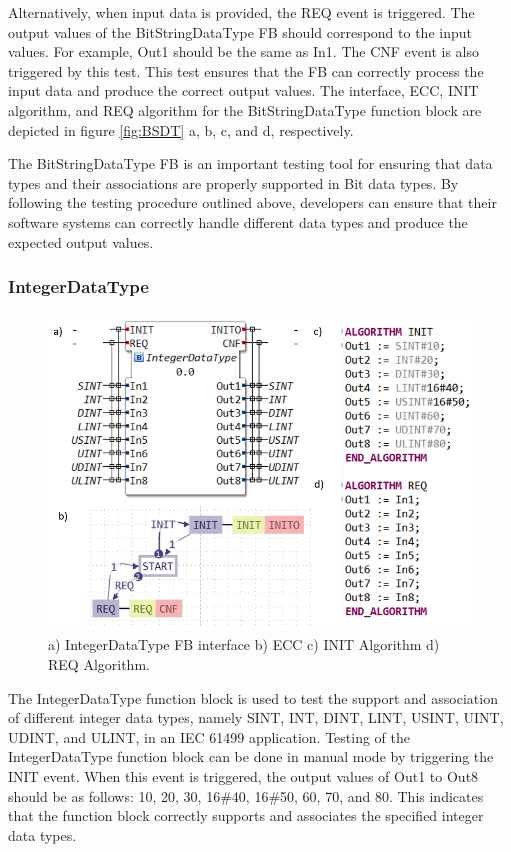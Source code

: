\begin{bibunit}
Alternatively, when input data is provided, the REQ event is triggered. The output values of the BitStringDataType FB should correspond to the input values. For example, Out1 should be the same as In1. The CNF event is also triggered by this test. This test ensures that the FB can correctly process the input data and produce the correct output values. The interface, ECC, INIT algorithm, and REQ algorithm for the BitStringDataType function block are depicted in figure \ref{fig:BSDT} a, b, c, and d, respectively.

The BitStringDataType FB is an important testing tool for ensuring that data types and their associations are properly supported in Bit data types. By following the testing procedure outlined above, developers can ensure that their software systems can correctly handle different data types and produce the expected output values.
\hfill \break
\subsubsection{IntegerDataType}

\begin{figure}[!b]
    \centering
    \includegraphics[width=\columnwidth]{MX_Papers/Paper8/Figures/IDT.PNG}
    \caption{a) IntegerDataType FB interface b) ECC c) INIT Algorithm d) REQ Algorithm.} 
    \label{fig:IDT}
\end{figure}

The IntegerDataType function block is used to test the support and association of different integer data types, namely SINT, INT, DINT, LINT, USINT, UINT, UDINT, and ULINT, in an IEC 61499 application. Testing of the IntegerDataType function block can be done in manual mode by triggering the INIT event. When this event is triggered, the output values of Out1 to Out8 should be as follows: 10, 20, 30, 16\#40, 16\#50, 60, 70, and 80. This indicates that the function block correctly supports and associates the specified integer data types.


\end{bibunit}
